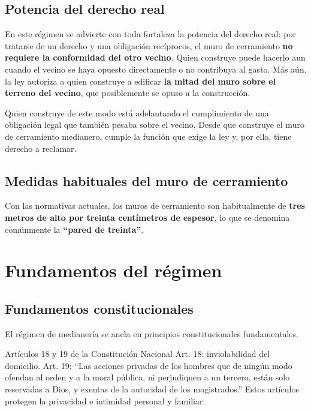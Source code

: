 \documentclass[12pt,oneside]{book}
\begin{document}
\subsection{Potencia del derecho real}

En este régimen se advierte con toda fortaleza la potencia del derecho real: por tratarse de un derecho y una obligación recíprocos, el muro de cerramiento \textbf{no requiere la conformidad del otro vecino}. Quien construye puede hacerlo aun cuando el vecino se haya opuesto directamente o no contribuya al gasto. Más aún, la ley autoriza a quien construye a edificar \textbf{la mitad del muro sobre el terreno del vecino}, que posiblemente se opuso a la construcción.

Quien construye de este modo está adelantando el cumplimiento de una obligación legal que también pesaba sobre el vecino. Desde que construye el muro de cerramiento medianero, cumple la función que exige la ley y, por ello, tiene derecho a reclamar.

\subsection{Medidas habituales del muro de cerramiento}

Con las normativas actuales, los muros de cerramiento son habitualmente de \textbf{tres metros de alto por treinta centímetros de espesor}, lo que se denomina comúnmente la \textbf{``pared de treinta''}.

\section{Fundamentos del régimen}

\subsection{Fundamentos constitucionales}

El régimen de medianería se ancla en principios constitucionales fundamentales.

\begin{definition}{Artículos 18 y 19 de la Constitución Nacional}
Art. 18: inviolabilidad del domicilio. Art. 19: ``Las acciones privadas de los hombres que de ningún modo ofendan al orden y a la moral pública, ni perjudiquen a un tercero, están solo reservadas a Dios, y exentas de la autoridad de los magistrados.'' Estos artículos protegen la privacidad e intimidad personal y familiar.
\end{definition}
\end{document}
